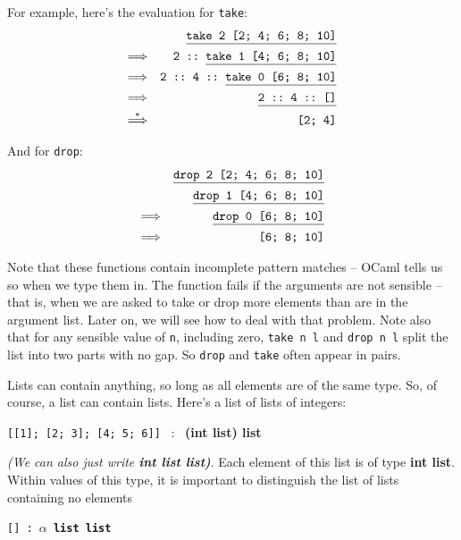 \documentclass[]{book}
\newcommand{\smspace}{\vspace{4mm}}
\begin{document}
\noindent For example, here's the evaluation for \texttt{take\! [2;\! 4;\! 6;\! 8;\! 10]}:
\begin{eqnarray*}
 & & \underline{\texttt{take 2 [2; 4; 6; 8; 10]\vphantom{g}}} \\
 \Longrightarrow & & \texttt{2 ::\ \underline{take 1 [4; 6; 8; 10]\vphantom{g}}}\\
 \Longrightarrow & & \texttt{2 ::\ 4 ::\ \underline{take 0 [6; 8; 10]\vphantom{g}}}\\
 \Longrightarrow & & \texttt{\underline{2 ::\ 4 ::\ []\vphantom{g}}}\\
 \overset{*}\Longrightarrow & & \texttt{[2; 4]\vphantom{g}}
\end{eqnarray*}

\noindent And for \texttt{drop\! [2;\! 4;\! 6;\! 8;\! 10]}:
\begin{eqnarray*}
 & & \underline{\texttt{drop 2 [2; 4; 6; 8; 10]\vphantom{g}}} \\
 & & \underline{\texttt{drop 1 [4; 6; 8; 10]\vphantom{g}}} \\
 \Longrightarrow & & \underline{\texttt{drop 0 [6; 8; 10]\vphantom{g}}} \\
 \Longrightarrow & & \texttt{[6; 8; 10]\vphantom{g}}
\end{eqnarray*}

\noindent Note that these functions contain incomplete pattern matches -- OCaml tells us so when we type them in. The function fails if the arguments are not sensible -- that is, when we are asked to take or drop more elements than are in the argument list. Later on, we will see how to deal with that problem. Note also that for any sensible value of \texttt{n}, including zero, \texttt{take\! n\! l} and \texttt{drop\! n\! l} split the list into two parts with no gap. So \texttt{drop} and \texttt{take} often appear in pairs.

Lists can contain anything, so long as all elements are of the same type. So, of course, a list can contain lists. Here's a list of lists of integers:

\smspace
\texttt{[[1]; [2; 3]; [4; 5; 6]]} \ : \ \textrm{\textbf{\textmd{(}int list\textmd{)} list}}\smspace

\noindent \textit{(We can also just write \textbf{\textrm{\textup{int list list})}}}. Each element of this list is of type \textrm{\textbf{int list}}. Within values of this type, it is important to distinguish the list of lists containing no elements

\smspace
\texttt{[] :\ \textrm{\textbf{$\alpha$ list list}}}
\smspace
\end{document}
